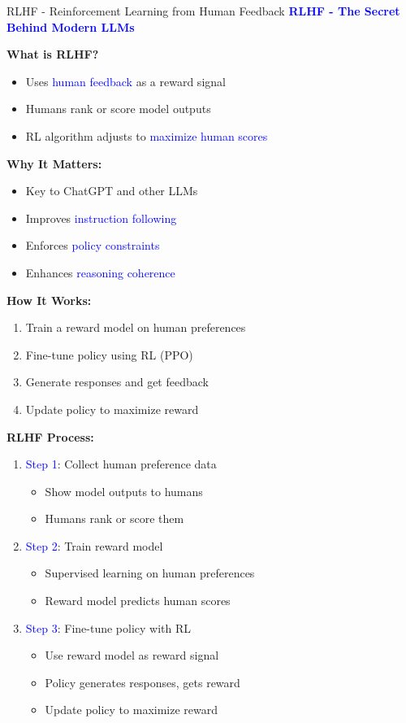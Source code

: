 \documentclass[8pt]{beamer}
\begin{document}

\begin{frame}{RLHF - Reinforcement Learning from Human Feedback}
\fontsize{6.5}{7.5}\selectfont
\textcolor{blue}{\textbf{RLHF - The Secret Behind Modern LLMs}}

\textbf{What is RLHF?}
\begin{itemize}
\item Uses \textcolor{blue}{human feedback} as a reward signal
\item Humans rank or score model outputs
\item RL algorithm adjusts to \textcolor{blue}{maximize human scores}
\end{itemize}

\textbf{Why It Matters:}
\begin{itemize}
\item Key to ChatGPT and other LLMs
\item Improves \textcolor{blue}{instruction following}
\item Enforces \textcolor{blue}{policy constraints}
\item Enhances \textcolor{blue}{reasoning coherence}
\end{itemize}

\textbf{How It Works:}
\begin{enumerate}
\item Train a reward model on human preferences
\item Fine-tune policy using RL (PPO)
\item Generate responses and get feedback
\item Update policy to maximize reward
\end{enumerate}

\textbf{RLHF Process:}
\begin{enumerate}
\item \textcolor{blue}{Step 1}: Collect human preference data
\begin{itemize}
\item Show model outputs to humans
\item Humans rank or score them
\end{itemize}
\item \textcolor{blue}{Step 2}: Train reward model
\begin{itemize}
\item Supervised learning on human preferences
\item Reward model predicts human scores
\end{itemize}
\item \textcolor{blue}{Step 3}: Fine-tune policy with RL
\begin{itemize}
\item Use reward model as reward signal
\item Policy generates responses, gets reward
\item Update policy to maximize reward
\end{itemize}
\end{enumerate}


\end{frame}
\end{document}
